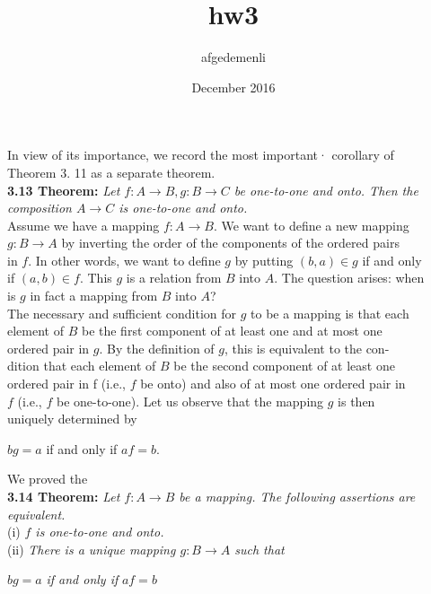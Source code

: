 \documentclass{article}
\title{hw3}
\author{afgedemenli }
\date{December 2016}
\begin{document}
    \setlength{\parindent}{0cm}
    
    In view of its importance, we record the most important· corollary of \\
    Theorem 3. 11 as a separate theorem. \\
    
    \textbf{3.13 Theorem:} \textit{ Let $f: A \rightarrow B, g: B \rightarrow C$ be one-to-one and onto. Then the} \\
    \textit{composition $A \rightarrow C$ is one-to-one and onto.}\\
    
    Assume we have a mapping $f: A \rightarrow B$. We want to define a new mapping \\
    $g: B \rightarrow A$ by inverting the order of the components of the ordered pairs \\
    in $f$. In other words, we want to define $g$ by putting $(b,a) \in  g $ if and only \\
    if $(a,b) \in f$. This $g$ is a relation from $B$ into $A$. The question arises: when \\
    is $g$ in fact a mapping from $B$ into $A$? \\ 
    
    The necessary and sufficient condition for $g$ to be a mapping is that each \\
    element of $B$ be the first component of at least one and at most one \\
    ordered pair in $g$. By the definition of $g$, this is equivalent to the con- \\
    dition that each element of $B$ be the second component of at least one \\
    ordered pair in f (i.e., $f$ be onto) and also of at most one ordered pair in \\
    $f$ (i.e., $f$ be one-to-one). Let us observe that the mapping $g$ is then \\
    uniquely determined by \\
    
    \begin{center} $bg =a$ if and only if $af =b$. \end{center}
    
    We proved the \\
    
    \textbf{3.14 Theorem:} \textit{ Let $f: A \rightarrow B$ be a mapping. The following assertions are \\ equivalent.\\}
    (i) \textit{ $f$ is one-to-one and onto.} \\
    (ii)\textit{ There is a unique mapping $g: B \rightarrow A$ such that\\}
    \begin{center} $bg = a$ \textit{if and only if} $af=b$ \end{center}
    
\end{document}
